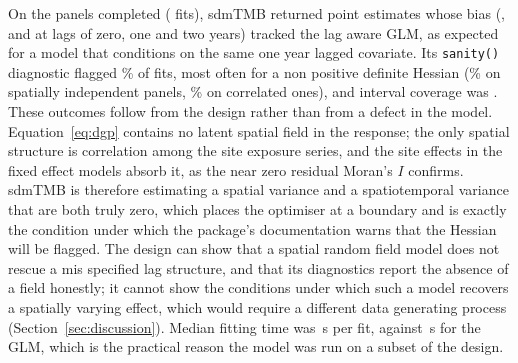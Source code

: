 On the \sdmtmbPanelsN{} panels completed (\sdmtmbFits{} fits), sdmTMB returned point estimates whose bias (\sdmtmbBiasLagZero{}, \sdmtmbBiasLagOne{} and \sdmtmbBiasLagTwo{} at lags of zero, one and two years) tracked the lag aware GLM, as expected for a model that conditions on the same one year lagged covariate. Its \texttt{sanity()} diagnostic flagged \sdmtmbNonConvPct{}\% of fits, most often for a non positive definite Hessian (\sdmtmbNonConvIndep{}\% on spatially independent panels, \sdmtmbNonConvCorr{}\% on correlated ones), and interval coverage was \sdmtmbCoverage{}. These outcomes follow from the design rather than from a defect in the model. Equation~\ref{eq:dgp} contains no latent spatial field in the response; the only spatial structure is correlation among the site exposure series, and the site effects in the fixed effect models absorb it, as the near zero residual Moran's $I$ confirms. sdmTMB is therefore estimating a spatial variance and a spatiotemporal variance that are both truly zero, which places the optimiser at a boundary and is exactly the condition under which the package's documentation warns that the Hessian will be flagged. The design can show that a spatial random field model does not rescue a mis specified lag structure, and that its diagnostics report the absence of a field honestly; it cannot show the conditions under which such a model recovers a spatially varying effect, which would require a different data generating process (Section~\ref{sec:discussion}). Median fitting time was \sdmtmbMedianSec{}\,s per fit, against \naiveSec{}\,s for the GLM, which is the practical reason the model was run on a subset of the design.
